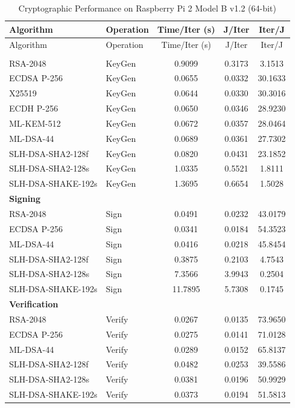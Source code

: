 \documentclass[11pt, letterpaper]{article}
\begin{document}
\begin{longtable}{llccc}
\caption{Cryptographic Performance on Raspberry Pi 2 Model B v1.2 (64-bit)} \\
\hline
Algorithm & Operation & Time/Iter (s) & J/Iter & Iter/J \\
\hline
\endfirsthead

\hline
Algorithm & Operation & Time/Iter (s) & J/Iter & Iter/J \\
\hline
\endhead

\hline
\endfoot

\hline
\endlastfoot

\multicolumn{5}{l}{\textbf{Key Generation}} \\

RSA-2048 & KeyGen & 0.9099 & 0.3173 & 3.1513 \\
ECDSA P-256 & KeyGen & 0.0655 & 0.0332 & 30.1633 \\
X25519 & KeyGen & 0.0644 & 0.0330 & 30.3016 \\
ECDH P-256 & KeyGen & 0.0650 & 0.0346 & 28.9230 \\
ML-KEM-512 & KeyGen & 0.0672 & 0.0357 & 28.0464 \\
ML-DSA-44 & KeyGen & 0.0689 & 0.0361 & 27.7302 \\
SLH-DSA-SHA2-128f & KeyGen & 0.0820 & 0.0431 & 23.1852 \\
SLH-DSA-SHA2-128s & KeyGen & 1.0335 & 0.5521 & 1.8111 \\
SLH-DSA-SHAKE-192s & KeyGen & 1.3695 & 0.6654 & 1.5028 \\

\multicolumn{5}{l}{\textbf{Signing}} \\

RSA-2048 & Sign & 0.0491 & 0.0232 & 43.0179 \\
ECDSA P-256 & Sign & 0.0341 & 0.0184 & 54.3523 \\
ML-DSA-44 & Sign & 0.0416 & 0.0218 & 45.8454 \\
SLH-DSA-SHA2-128f & Sign & 0.3875 & 0.2103 & 4.7543 \\
SLH-DSA-SHA2-128s & Sign & 7.3566 & 3.9943 & 0.2504 \\
SLH-DSA-SHAKE-192s & Sign & 11.7895 & 5.7308 & 0.1745 \\

\multicolumn{5}{l}{\textbf{Verification}} \\

RSA-2048 & Verify & 0.0267 & 0.0135 & 73.9650 \\
ECDSA P-256 & Verify & 0.0275 & 0.0141 & 71.0128 \\
ML-DSA-44 & Verify & 0.0289 & 0.0152 & 65.8137 \\
SLH-DSA-SHA2-128f & Verify & 0.0482 & 0.0253 & 39.5586 \\
SLH-DSA-SHA2-128s & Verify & 0.0381 & 0.0196 & 50.9929 \\
SLH-DSA-SHAKE-192s & Verify & 0.0373 & 0.0194 & 51.5813 \\

\end{longtable}
\end{document}
